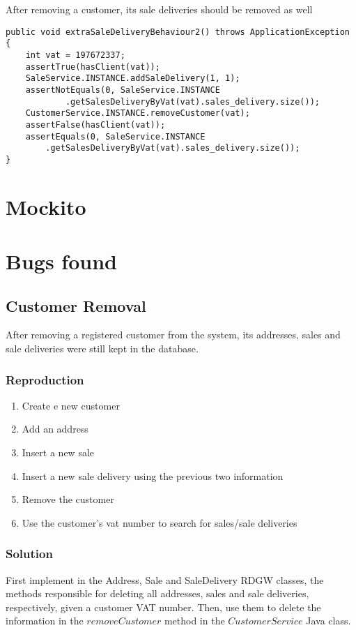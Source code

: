 \documentclass[12pt]{article}
\begin{document}
After removing a customer, its sale deliveries should be removed as well
\begin{lstlisting}
public void extraSaleDeliveryBehaviour2() throws ApplicationException {
	int vat = 197672337;
	assertTrue(hasClient(vat));
	SaleService.INSTANCE.addSaleDelivery(1, 1);
	assertNotEquals(0, SaleService.INSTANCE
			.getSalesDeliveryByVat(vat).sales_delivery.size());
	CustomerService.INSTANCE.removeCustomer(vat);
	assertFalse(hasClient(vat));
	assertEquals(0, SaleService.INSTANCE
		.getSalesDeliveryByVat(vat).sales_delivery.size());
}
\end{lstlisting}

\newpage
\section{Mockito}


\section{Bugs found}
\subsection{Customer Removal}
After removing a registered customer from the system, its addresses, sales and sale deliveries were still kept in the database.

\subsubsection{Reproduction}
\begin{enumerate}
   \item  Create e new customer
   
   \item  Add an address
   
   \item  Insert a new sale
   
   \item  Insert a new sale delivery using the previous two information
      
   \item  Remove the customer
      
   \item  Use the customer's vat number to search for sales/sale deliveries
\end{enumerate}


\subsubsection{Solution}
First implement in the Address, Sale and SaleDelivery RDGW classes, the methods responsible for deleting all addresses, sales and sale deliveries, respectively, given a customer VAT number. Then, use them to delete the information in the $removeCustomer$ method in the $CustomerService$ Java class.
\newpage
\end{document}
